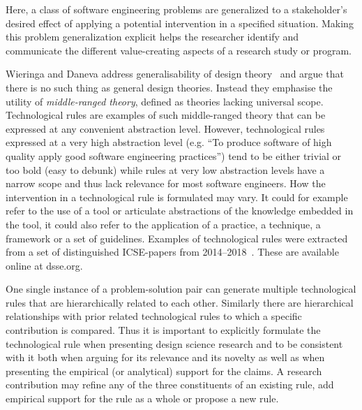 \documentclass[graybox]{svmult}
\begin{document}
Here, a class of software engineering problems are generalized to a stakeholder's desired effect of applying a potential intervention in a specified situation. 
Making this problem generalization explicit helps the researcher identify and communicate the different value-creating aspects of a research study or program.



Wieringa and Daneva address generalisability of design theory~\cite{wieringa_six_2015} and argue that there is no such thing as general design theories. Instead they emphasise the utility of \emph{middle-ranged theory}, defined as theories lacking universal scope. 
Technological rules are examples of such middle-ranged theory that can be expressed at any convenient abstraction level. However, technological rules expressed at a very high abstraction level (e.g. ``To produce software of high quality apply good software engineering practices'') tend to be either trivial or too bold (easy to debunk) while rules at very low abstraction levels have a narrow scope and thus lack relevance for most software engineers. How the intervention in a technological rule is formulated may vary. It could for example refer to the use of a tool or articulate abstractions of the knowledge embedded in the tool, it could also refer to the application of a practice, a technique, a framework or a set of guidelines. Examples of technological rules were extracted from a set of distinguished ICSE-papers from 2014--2018~\cite{Engstrom19arxiv}. These are available online at dsse.org.

One single instance of a problem-solution pair can generate multiple technological rules that are hierarchically related to each other. Similarly there are hierarchical relationships with prior related technological rules to which a specific contribution is compared.
Thus it is important to explicitly formulate the technological rule when presenting design science research and to be consistent with it both when arguing for its relevance and its novelty as well as when presenting the empirical (or analytical) support for the claims.  A research contribution may refine any of the three constituents of an existing rule, add empirical support for the rule as a whole or propose a new rule.

\end{document}
